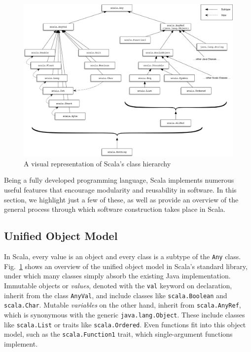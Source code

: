\documentclass[jou,apacite]{IEEEtran}
\begin{document}
\begin{figure}[t]
  \centering
  \includegraphics[width=0.9\linewidth]{scala_classes}
  \caption{A visual representation of Scala's class hierarchy}
  \label{fig:scala-classes}
\end{figure} 

Being a fully developed programming language, Scala implements numerous useful
features that encourage modularity and reusability in software. In this section,
we highlight just a few of these, as well as provide an overview of the general
process through which software construction takes place in Scala.

\subsection{Unified Object Model}
\label{sec:unified-object-model}

In Scala, every value is an object and every class is a subtype of the
\texttt{Any} class. Fig.~\ref{fig:scala-classes} shows an overview of the
unified object model in Scala's standard library, under which many classes
simply absorb the existing Java implementation. Immutable objects or
\emph{values}, denoted with the \texttt{val} keyword on declaration, inherit
from the class \texttt{AnyVal}, and include classes like \texttt{scala.Boolean}
and \texttt{scala.Char}. Mutable \emph{variables} on the other hand, inherit
from \texttt{scala.AnyRef}, which is synonymous with the generic
\texttt{java.lang.Object}. These include classes like \texttt{scala.List} or
traits like \texttt{scala.Ordered}. Even functions fit into this object model,
such as the \texttt{scala.Function1} trait, which single-argument functions
implement.
\end{document}
